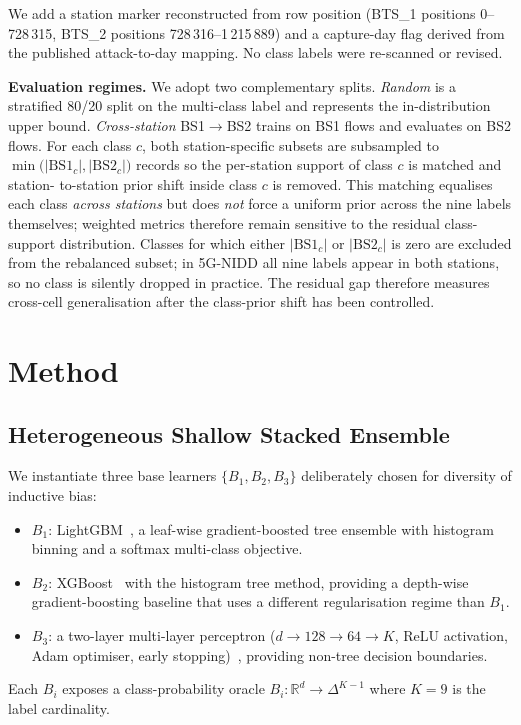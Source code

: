\documentclass[conference]{IEEEtran}
\begin{document}
We add a station marker reconstructed from row position (BTS\_1
positions 0--728\,315, BTS\_2 positions 728\,316--1\,215\,889) and a
capture-day flag derived from the published attack-to-day mapping. No
class labels were re-scanned or revised.

\textbf{Evaluation regimes.} We adopt two complementary splits.
\emph{Random} is a stratified 80/20 split on the multi-class label and
represents the in-distribution upper bound. \emph{Cross-station}
BS1$\rightarrow$BS2 trains on BS1 flows and evaluates on BS2 flows. For
each class $c$, both station-specific subsets are subsampled to
$\min\bigl(\lvert\text{BS1}_c\rvert, \lvert\text{BS2}_c\rvert\bigr)$
records so the per-station support of class $c$ is matched and station-
to-station prior shift inside class $c$ is removed. This matching
equalises each class \emph{across stations} but does \emph{not} force a
uniform prior across the nine labels themselves; weighted metrics
therefore remain sensitive to the residual class-support distribution.
Classes for which either $\lvert\text{BS1}_c\rvert$ or
$\lvert\text{BS2}_c\rvert$ is zero are excluded from the rebalanced
subset; in 5G-NIDD all nine labels appear in both stations, so no class
is silently dropped in practice. The residual gap therefore measures
cross-cell generalisation after the class-prior shift has been
controlled.

\section{Method}
\label{sec:method}

\subsection{Heterogeneous Shallow Stacked Ensemble}

We instantiate three base learners $\{B_1, B_2, B_3\}$ deliberately
chosen for diversity of inductive bias:
\begin{itemize}
    \item $B_1$: LightGBM~\cite{ke2017_lightgbm}, a leaf-wise
        gradient-boosted tree ensemble with histogram binning and a
        softmax multi-class objective.
    \item $B_2$: XGBoost~\cite{chen2016_xgboost} with the histogram
        tree method, providing a depth-wise gradient-boosting baseline
        that uses a different regularisation regime than $B_1$.
    \item $B_3$: a two-layer multi-layer perceptron
        ($d \to 128 \to 64 \to K$, ReLU activation, Adam optimiser,
        early stopping)~\cite{pedregosa2011_sklearn}, providing
        non-tree decision boundaries.
\end{itemize}
Each $B_i$ exposes a class-probability oracle
$B_i: \mathbb{R}^d \to \Delta^{K-1}$ where $K=9$ is the label cardinality.
\end{document}
